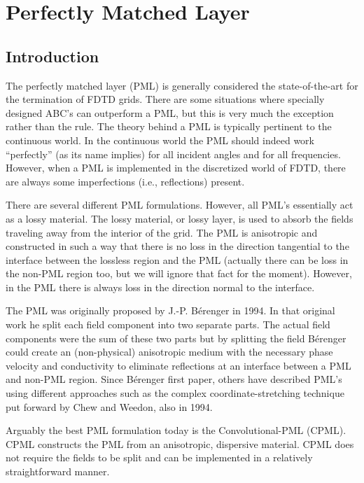 \chapter{Perfectly Matched Layer \label{chap:pml}}


\renewcommand{\thefootnote}{\fnsymbol{footnote}}

\section{Introduction}

The perfectly matched layer (PML) is generally considered the
state-of-the-art for the termination of FDTD grids.  There are some
situations where specially designed ABC's can outperform a PML, but
this is very much the exception rather than the rule.  The theory
behind a PML is typically pertinent to the continuous world.  In the
continuous world the PML should indeed work ``perfectly'' (as its
name implies) for all incident angles and for all frequencies.
However, when a PML is implemented in the discretized world of FDTD,
there are always some imperfections (i.e., reflections) present.

There are several different PML formulations.  However, all PML's
essentially act as a lossy material.  The lossy material, or lossy
layer, is used to absorb the fields traveling away from the interior
of the grid.  The PML is anisotropic and constructed in such a way
that there is no loss in the direction tangential to the interface
between the lossless region and the PML (actually there can be loss in
the non-PML region too, but we will ignore that fact for the moment).
However, in the PML there is always loss in the direction normal to
the interface.

The PML was originally proposed by J.-P. B\'{e}renger in 1994.  In
that original work he split each field component into two separate
parts.  The actual field components were the sum of these two parts
but by splitting the field B\'{e}renger could create an (non-physical)
anisotropic medium with the necessary phase velocity and conductivity
to eliminate reflections at an interface between a PML and non-PML
region.  Since B\'{e}renger first paper, others have described PML's
using different approaches such as the complex coordinate-stretching
technique put forward by Chew and Weedon, also in 1994.

Arguably the best PML formulation today is the Convolutional-PML
(CPML).  CPML constructs the PML from an anisotropic, dispersive
material.  CPML does not require the fields to be split and can be
implemented in a relatively straightforward manner.  

